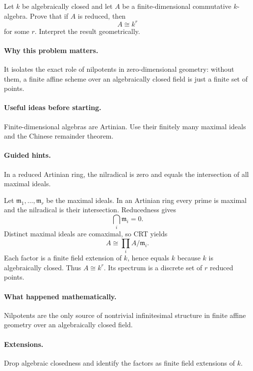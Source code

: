 \begin{problem}
Let $k$ be algebraically closed and let $A$ be a finite-dimensional commutative
$k$-algebra.  Prove that if $A$ is reduced, then
\[
A\cong k^r
\]
for some $r$.  Interpret the result geometrically.
\end{problem}
\paragraph{Why this problem matters.}
It isolates the exact role of nilpotents in zero-dimensional geometry: without them, a
finite affine scheme over an algebraically closed field is just a finite set of points.
\paragraph{Useful ideas before starting.}
Finite-dimensional algebras are Artinian.  Use their finitely many maximal ideals and the
Chinese remainder theorem.
\paragraph{Guided hints.}
In a reduced Artinian ring, the nilradical is zero and equals the intersection of all
maximal ideals.
\begin{solution}
Let $\mathfrak m_1,\dots,\mathfrak m_r$ be the maximal ideals.  In an Artinian ring every
prime is maximal and the nilradical is their intersection.  Reducedness gives
\[
\bigcap_i\mathfrak m_i=0.
\]
Distinct maximal ideals are comaximal, so CRT yields
\[
A\cong\prod_i A/\mathfrak m_i.
\]
Each factor is a finite field extension of $k$, hence equals $k$ because $k$ is algebraically
closed.  Thus $A\cong k^r$.  Its spectrum is a discrete set of $r$ reduced points.
\end{solution}
\paragraph{What happened mathematically.}
Nilpotents are the only source of nontrivial infinitesimal structure in finite affine
geometry over an algebraically closed field.
\paragraph{Extensions.}
Drop algebraic closedness and identify the factors as finite field extensions of $k$.
